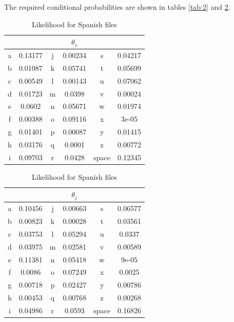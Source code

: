 \documentclass[a4paper]{article}
\theoremstyle{definition}
\newenvironment{soln}{
    \leavevmode\color{blue}\ignorespaces
}{}
\begin{document}
\begin{enumerate}
\begin{soln}
    The required conditional probabilities are shown in tables \ref{tab:2} and \ref{tab:3}.
    \begin{table}[H]
        \centering
        \begin{tabular}{|c|c|c|c|c|c|}
            \hline
            \multicolumn{6}{|c|}{$\theta_s$}\\
            \hline
            a & 0.13177 & j & 0.00234 & s & 0.04217 \\
            \hline
            b & 0.01087 & k & 0.05741 & t & 0.05699 \\
            \hline
            c & 0.00549 & l & 0.00143 & u & 0.07062 \\
            \hline
            d & 0.01723 & m & 0.0398 & v & 0.00024 \\
            \hline
            e & 0.0602 & n & 0.05671 & w & 0.01974 \\
            \hline
            f & 0.00388 & o & 0.09116 & x & 3e-05 \\
            \hline
            g & 0.01401 & p & 0.00087 & y & 0.01415 \\
            \hline
            h & 0.03176 & q & 0.0001 & z & 0.00772 \\
            \hline
            i & 0.09703 & r & 0.0428 & space & 0.12345 \\
            \hline
        \end{tabular}
        \caption{Likelihood for Japanese Files}
        \label{tab:2}%
        \begin{tabular}{|c|c|c|c|c|c|}
            \hline
            \multicolumn{6}{|c|}{$\theta_j$}\\
            \hline
            a & 0.10456 & j & 0.00663 & s & 0.06577 \\
            \hline
            b & 0.00823 & k & 0.00028 & t & 0.03561 \\
            \hline
            c & 0.03753 & l & 0.05294 & u & 0.0337 \\
            \hline
            d & 0.03975 & m & 0.02581 & v & 0.00589 \\
            \hline
            e & 0.11381 & n & 0.05418 & w & 9e-05 \\
            \hline
            f & 0.0086 & o & 0.07249 & x & 0.0025 \\
            \hline
            g & 0.00718 & p & 0.02427 & y & 0.00786 \\
            \hline
            h & 0.00453 & q & 0.00768 & z & 0.00268 \\
            \hline
            i & 0.04986 & r & 0.0593 & space & 0.16826 \\
            \hline
        \end{tabular}
        \caption{Likelihood for Spanish files}
        \label{tab:3}
    \end{table}
\end{soln}
\pagebreak


\end{enumerate}
\end{document}
